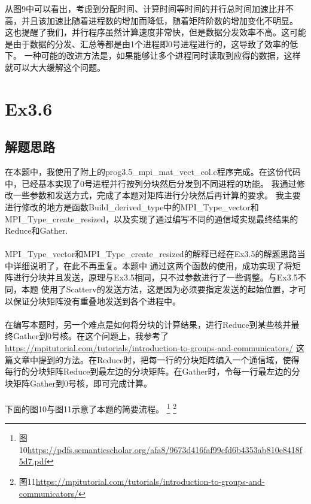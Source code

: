 \documentclass[UTF8]{article}
\begin{document}
    从图9中可以看出，考虑到分配时间、计算时间等时间的并行总时间加速比并不高，并且该加速比随着进程数的增加而降低，随着矩阵阶数的增加变化不明显。
    这也提醒了我们，并行程序虽然计算速度非常快，但是数据分发效率不高。这可能是由于数据的分发、汇总等都是由1个进程即0号进程进行的，这导致了效率的低下。
    一种可能的改进方法是，如果能够让多个进程同时读取到应得的数据，这样就可以大大缓解这个问题。

\clearpage





\section{Ex3.6}
\subsection{解题思路}
在本题中，我使用了附上的prog3.5\_mpi\_mat\_vect\_col.c程序完成。在这份代码中，已经基本实现了0号进程并行按列分块然后分发到不同进程的功能。
我通过修改一些参数和发送方式，完成了本题对矩阵进行分块然后再计算的要求。
我主要进行修改的地方是函数Build\_derived\_type中的MPI\_Type\_vector和MPI\_Type\_create\_resized，以及实现了通过编写不同的通信域实现最终结果的Reduce和Gather.\\\\

MPI\_Type\_vector和MPI\_Type\_create\_resized的解释已经在Ex3.5的解题思路当中详细说明了，在此不再重复。本题中
通过这两个函数的使用，成功实现了将矩阵进行分块并且发送，原理与Ex3.5相同，只不过参数进行了一些调整。与Ex3.5不同，本题
使用了Scatterv的发送方法，这是因为必须要指定发送的起始位置，才可以保证分块矩阵没有重叠地发送到各个进程中。\\\\

在编写本题时，另一个难点是如何将分块的计算结果，进行Reduce到某些核并最终Gather到0号核。在这个问题上，我参考了\url{https://mpitutorial.com/tutorials/introduction-to-groups-and-communicators/}
这篇文章中提到的方法。在Reduce时，把每一行的分块矩阵编入一个通信域，使得每行的分块矩阵Reduce到最左边的分块矩阵。在Gather时，令每一行最左边的分块矩阵Gather到0号核，即可完成计算。\\\\

下面的图10与图11示意了本题的简要流程。
\footnote{图10\url{https://pdfs.semanticscholar.org/afa8/9673d416faf99cfd6b4353ab810e8418f5d7.pdf}}
\footnote{图11\url{https://mpitutorial.com/tutorials/introduction-to-groups-and-communicators/}}
\end{document}
